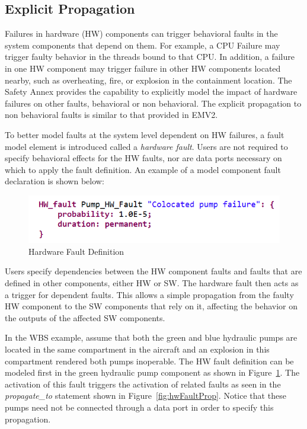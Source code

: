 \subsection{Explicit Propagation} 
Failures in hardware (HW) components can trigger behavioral faults in the system components that depend on them. For example, a CPU %
Failure may trigger faulty behavior in the threads bound to that CPU. In addition, a %
failure in one HW component may trigger %
failure in other HW components located nearby, such as overheating, fire, or explosion
in the containment location. 
The Safety Annex provides the capability to explicitly model the impact of hardware %
failures on other faults, behavioral or non behavioral. The explicit propagation to non behavioral faults is similar to that provided in EMV2.

To better model %
faults at the system level dependent on HW failures, a fault model element is introduced called a \textit{hardware fault}. Users are not required to specify behavioral effects for the HW faults, nor are data ports necessary on which to apply the fault definition. An example of a model component fault declaration is shown below:
\begin{figure}[h!]
	\begin{center}
	\includegraphics[width=.6\textwidth]{images/hw_fault2.png}
	\end{center}
	\vspace{-0.1in}
	\caption{Hardware Fault Definition}
	\label{fig:hwFault}
\end{figure}

Users specify dependencies between the HW component faults and faults that are defined in other components, either HW or SW. The hardware fault then acts as a trigger for dependent faults. This allows a simple propagation from the faulty HW component to the SW components that rely on it, affecting the behavior on the outputs of the affected SW components.

In the WBS example, assume that both the green and blue hydraulic pumps are located in the same compartment in the aircraft and an explosion in this compartment rendered both pumps inoperable. 
The HW fault definition can be modeled first in the green hydraulic pump component as shown in Figure~\ref{fig:hwFault}. The activation of this fault triggers the activation of related faults as seen in the \textit{propagate\_to} statement shown in Figure~\ref{fig:hwFaultProp}. 
Notice that these pumps need not be connected through a data port in order to specify this propagation. %

